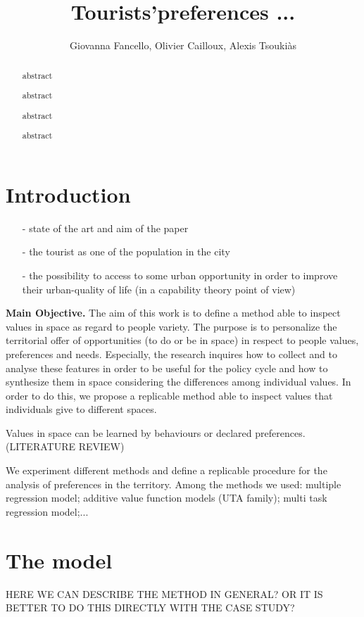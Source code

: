 \documentclass[a4paper]{article}
\author{Giovanna Fancello, Olivier Cailloux, Alexis Tsoukiàs}
\title{Tourists'preferences ...}
\begin{document}
\maketitle
\begin{abstract}
abstract

abstract

abstract

abstract
\end{abstract}

\tableofcontents

\section{Introduction}
\begin{itemize}
   \item [-]state of the art and aim of the paper
   \item [-]the tourist as one of the population in the city
   \item [-]the possibility to access to some urban opportunity in order to improve their urban-quality of life (in a capability theory point of view)
 \end{itemize}

\textbf{Main Objective.}
The aim of this work is to define a method able to inspect values in space as regard to people variety. The purpose is to personalize the territorial offer of opportunities (to do or be in space) in respect to people values, preferences and needs. Especially, the research inquires how to collect and to analyse these features in order to be useful for the policy cycle and how to synthesize them in space considering the differences among individual values. In order to do this, we propose a replicable method able to inspect values that individuals give to different spaces.

Values in space can be learned by behaviours or declared preferences.(LITERATURE REVIEW)

We experiment different methods and define a replicable procedure for the analysis of preferences in the territory. Among the methods we used: multiple regression model; additive value function models (UTA family); multi task regression model;...

\section{The model}
HERE WE CAN DESCRIBE THE METHOD IN GENERAL? OR IT IS BETTER TO DO THIS DIRECTLY WITH THE CASE STUDY?
\end{document}
